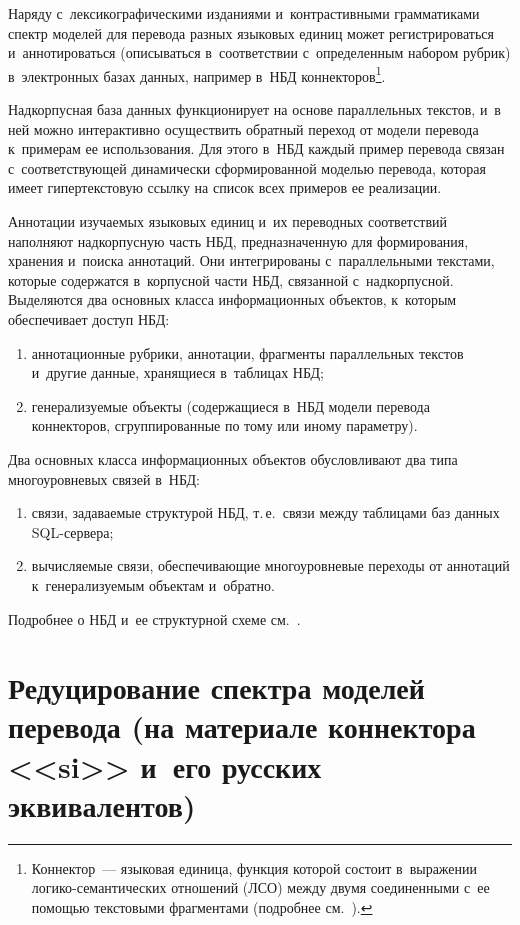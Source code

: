 \begin{multicols}{2}
Наряду с~лексикографическими изданиями и~контрастивными грамматиками спектр моделей для перевода 
разных языковых единиц может регистрироваться и~аннотироваться (описываться в~соответствии 
с~определенным набором рубрик) в~электронных базах данных, например в~НБД 
коннекторов\footnote[4]{Коннектор~--- языковая единица, функция которой состоит в~выражении  
логико-семантических отношений (ЛСО) между двумя соединенными с~ее помощью текстовыми 
фрагментами (подробнее см.~\cite{16-n, 17-n, 18-n}).}.
  
  Надкорпусная база данных функционирует на основе параллельных текстов, и~в ней можно 
интерактивно осуществить обратный переход от модели перевода 
к~примерам ее использования. Для этого в~НБД каждый пример перевода 
связан с~соответствующей динамически сформированной моделью перевода, 
которая имеет гипертекстовую ссылку на список всех примеров ее 
реализации.
  
  Аннотации изучаемых языковых единиц и~их переводных соответствий 
наполняют надкорпусную часть НБД, предназначенную для формирования, 
хранения и~поиска аннотаций. Они интегрированы с~параллельными 
текстами, которые содержатся в~корпусной части НБД, связанной 
с~надкорпусной. Выделяются два основных класса информационных объектов, к~которым обеспечивает доступ НБД:
  \begin{enumerate}[(1)]
\item аннотационные рубрики, аннотации, фрагменты параллельных текстов и~другие данные, хранящиеся в~таблицах НБД;
  \item генерализуемые объекты (содержащиеся в~НБД модели перевода 
коннекторов, сгруппированные по тому или иному параметру).
  \end{enumerate}
  
  Два основных класса информационных объектов обусловливают два типа 
многоуровневых связей в~НБД:
  \begin{enumerate}[(1)]
  \item связи, задаваемые структурой НБД, т.\,е.\ связи между таблицами баз 
данных SQL-сер\-вера;
  \item вычисляемые связи, обеспечивающие многоуровневые переходы от 
аннотаций к~генерализуемым объектам и~обратно.
  \end{enumerate}
  
  
  Подробнее о НБД и~ее структурной схеме см.~\cite{15-n}.
  
  \section{Редуцирование спектра моделей перевода (на материале 
коннектора <<si>> и~его русских эквивалентов)}
  

\end{multicols}
